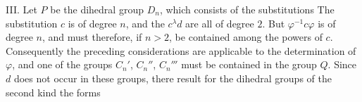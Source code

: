 III. Let $P$ be the dihedral group $D_n$, which consists of the substitutions
The substitution $c$ is of degree $n$, and the $c^\lambda d$ are all of degree $2$. But $\varphi^{-1}c\varphi$ is of degree $n$, and must therefore, if $n > 2$, be contained among the powers of $c$. Consequently the preceding considerations are applicable to the determination of $\varphi$, and one of the groups $C_n'$, $C_n''$, $C_n'''$ must be contained in the group $Q$. Since $d$ does not occur in these groups, there result for the dihedral groups of the second kind the forms
